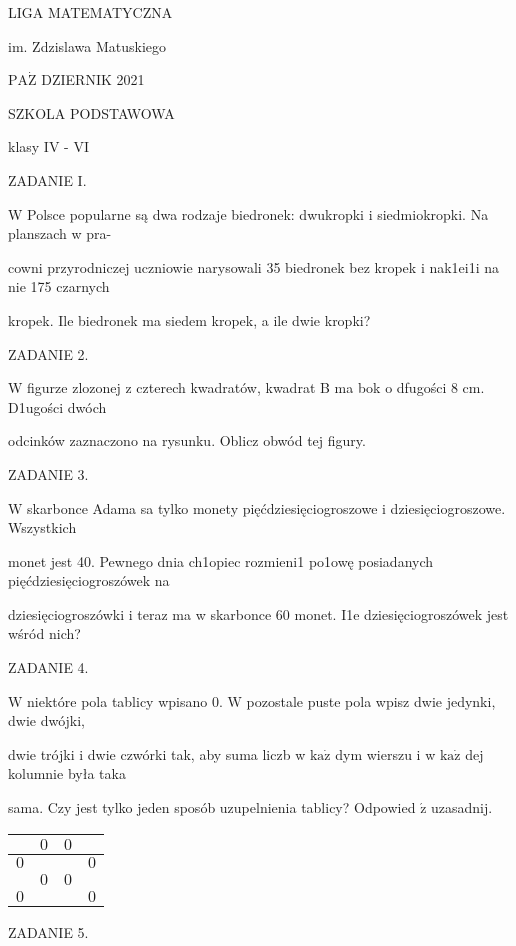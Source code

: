 \documentclass[a4paper,12pt]{article}
\begin{document}
LIGA MATEMATYCZNA

im. Zdzislawa Matuskiego

$\mathrm{P}\mathrm{A}\dot{\mathrm{Z}}$ DZIERNIK 2021

SZKOLA PODSTAWOWA

klasy IV - VI

ZADANIE I.

W Polsce popularne są dwa rodzaje biedronek: dwukropki i siedmiokropki. Na planszach w pra-

cowni przyrodniczej uczniowie narysowali 35 biedronek bez kropek i nak1ei1i na nie 175 czarnych

kropek. Ile biedronek ma siedem kropek, a ile dwie kropki?

ZADANIE 2.

W figurze zlozonej z czterech kwadratów, kwadrat B ma bok o dfugości 8 cm. D1ugości dwóch

odcinków zaznaczono na rysunku. Oblicz obwód tej figury.

ZADANIE 3.

$\mathrm{W}$ skarbonce Adama sa tylko monety pięćdziesięciogroszowe i dziesięciogroszowe. Wszystkich

monet jest 40. Pewnego dnia ch1opiec rozmieni1 po1owę posiadanych pięćdziesięciogroszówek na

dziesięciogroszówki i teraz ma w skarbonce 60 monet. I1e dziesięciogroszówek jest wśród nich?

ZADANIE 4.

$\mathrm{W}$ niektóre pola tablicy wpisano 0. $\mathrm{W}$ pozostale puste pola wpisz dwie jedynki, dwie dwójki,

dwie trójki i dwie czwórki tak, aby suma liczb w $\mathrm{k}\mathrm{a}\dot{\mathrm{z}}$ dym wierszu i w $\mathrm{k}\mathrm{a}\dot{\mathrm{z}}$ dej kolumnie była taka

sama. Czy jest tylko jeden sposób uzupelnienia tablicy? Odpowied $\acute{\mathrm{z}}$ uzasadnij.
\begin{center}
\begin{tabular}{|l|l|l|l|}
\hline
\multicolumn{1}{|l|}{}&	\multicolumn{1}{|l|}{$0$}&	\multicolumn{1}{|l|}{ $0$}&	\multicolumn{1}{|l|}{}	\\
\hline
\multicolumn{1}{|l|}{ $0$}&	\multicolumn{1}{|l|}{}&	\multicolumn{1}{|l|}{}&	\multicolumn{1}{|l|}{ $0$}	\\
\hline
\multicolumn{1}{|l|}{}&	\multicolumn{1}{|l|}{ $0$}&	\multicolumn{1}{|l|}{ $0$}&	\multicolumn{1}{|l|}{}	\\
\hline
\multicolumn{1}{|l|}{ $0$}&	\multicolumn{1}{|l|}{}&	\multicolumn{1}{|l|}{}&	\multicolumn{1}{|l|}{ $0$}	\\
\hline
\end{tabular}

\end{center}
ZADANIE 5.
\end{document}
